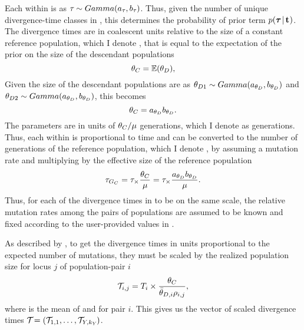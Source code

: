 \begin{linenomath}
Each \divTime{} within \divTimeVector is \iid as $\tau_{} \sim
Gamma(a_{\tau_{}}, b_{\tau_{}})$.
Thus, given the number of unique divergence-time classes in
\divTimeIndexVector, this determines the probability of prior term
$p(\boldsymbol{\tau_{}} \,|\, \mathbf{t_{}})$.
The divergence times are in coalescent units relative to the size of
a constant reference population, which I denote , that is equal to
the expectation of the prior on the size of the descendant populations
\begin{equation}
    \myTheta{C} = \mathbb{E}(\descendantTheta{}{}),
    \label{eq:thetaC}
\end{equation}
Given the size of the descendant populations are \iid as
$\descendantTheta{1}{} \sim Gamma(\gammaShape{\descendantTheta{}{}},
\gammaScale{\descendantTheta{}{}})$ and
$\descendantTheta{2}{} \sim Gamma(\gammaShape{\descendantTheta{}{}},
\gammaScale{\descendantTheta{}{}})$,
this becomes
\begin{equation}
    \myTheta{C} = \gammaShape{\descendantTheta{}{}}\gammaScale{\descendantTheta{}{}}.
    \label{eq:thetaCGamma}
\end{equation}
The \divTime{} parameters are in units of $\theta_{C}/\mu$
generations, which I denote as \globalcoalunit generations.
Thus, each \divTime{} within \divTimeVector is proportional to time and can be
converted to the number of generations of the reference population, which I
denote , by assuming a mutation rate and multiplying by the
effective size of the reference population
\begin{equation}
    \divTime{G_C} = \divTime \times \frac{\myTheta{C}}{\mutationRate} = \divTime
    \times \frac{
    \gammaShape{\descendantTheta{}{}}\gammaScale{\descendantTheta{}{}}}
    {\mutationRate}.
    \label{eq:divTimeGenerations}
\end{equation}
Thus, for each of the divergence times in \divTimeVector to be on the same
scale, the relative mutation rates among the pairs of populations are assumed
to be known and fixed according to the user-provided values in
\mutationRateScalarConstantVector.
\end{linenomath}

\begin{linenomath}
As described by \citet{Oaks2012}, to get the divergence times in units
proportional to the expected number of mutations, they must be
scaled by the realized population size for locus $j$ of population-pair $i$ 
\begin{equation}
    \divTimeScaled{i}{j} = \divTimeMap{i} \times \frac{\myTheta{C}}{
        \descendantThetaMean{i} \ploidyScalar{i}{j}},
    \label{eq:divTimeScaled}
\end{equation}
where  is the mean of  and
 for pair $i$.
This gives us the vector of scaled divergence times
$\divTimeScaledVector = (\divTimeScaled{1}{1}, \ldots,
\divTimeScaled{\npairs{}}{\nloci{\npairs{}}})$.
\end{linenomath}


